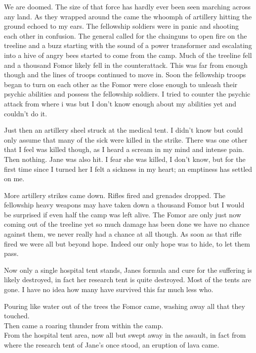We are doomed. The size of that force has hardly ever been seen marching across any land. As they wrapped around the came the whoomph of artillery hitting the ground echoed to my ears. The fellowship soldiers were in panic and shooting each other in confusion. The general called for the chainguns to open fire on the treeline and a buzz starting with the sound of a power transformer and escalating into a hive of angry bees started to come from the camp. Much of the treeline fell and a thousand Fomor likely fell in the counterattack. This was far from enough though and the lines of troops continued to move in. Soon the fellowship troops began to turn on each other as the Fomor were close enough to unleash their psychic abilities and possess the fellowship soldiers. I tried to counter the psychic attack from where i was but I don't know enough about my abilities yet and couldn't do it.

Just then an artillery sheel struck at the medical tent. I didn't know but could only assume that many of the sick were killed in the strike. There was one other that I feel was killed though, as I heard a scream in my mind and intense pain. Then nothing. Jane was also hit. I fear she was killed, I don't know, but for the first time since I turned her I felt a sickness in my heart; an emptiness has settled on me.

More artillery strikes came down. Rifles fired and grenades dropped. The fellowship heavy weapons may have taken down a thousand Fomor but I would be surprised if even half the camp was left alive. The Fomor are only just now coming out of the treeline yet so much damage has been done we have no chance against them, we never really had a chance at all though. As soon as that rifle fired we were all but beyond hope. Indeed our only hope was to hide, to let them pass.

Now only a single hospital tent stands, Janes formula and cure for the suffering is likely destroyed, in fact her research tent is quite destroyed. Most of the tents are gone. I have no idea how many have survived this far much less who.

Pouring like water out of the trees the Fomor came, washing away all that they touched.\\

Then came a roaring thunder from within the camp.\\

From the hospital tent area, now all but swept away in the assault, in fact from where the research tent of Jane's once stood, an eruption of lava came.

